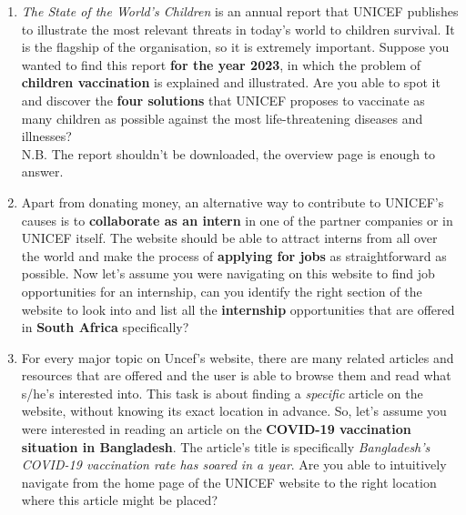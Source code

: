 \documentclass[11pt]{article}
\begin{document}
\begin{Form}
\begin{enumerate}
		\item \textit{The State of the World's Children} is an annual report that UNICEF publishes to illustrate the most relevant threats in today's world to children survival. It is the flagship of the organisation, so it is extremely important. Suppose you wanted to find this report \textbf{for the year 2023}, in which the problem of \textbf{children vaccination} is explained and illustrated. Are you able to spot it and discover the \textbf{four solutions} that UNICEF proposes to vaccinate as many children as possible against the most life-threatening diseases and illnesses?\\
		N.B. The report shouldn't be downloaded, the overview page is enough to answer.
		
		\item Apart from donating money, an alternative way to contribute to UNICEF's causes is to \textbf{collaborate as an intern} in one of the partner companies or in UNICEF itself. The website should be able to attract interns from all over the world and make the process of \textbf{applying for jobs} as straightforward as possible. Now let's assume you were navigating on this website to find job opportunities for an internship, can you identify the right section of the website to look into and list all the \textbf{internship} opportunities that are offered in \textbf{South Africa} specifically?
		
		\item For every major topic on Uncef's website, there are many related articles and resources that are offered and the user is able to browse them and read what s/he's interested into. This task is about finding a \textit{specific} article on the website, without knowing its exact location in advance. So, let's assume you were interested in reading an article on the\textbf{ COVID-19 vaccination situation in Bangladesh}. The article's title is specifically \textit{Bangladesh's COVID-19 vaccination rate has soared in a year}. Are you able to intuitively navigate from the home page of the UNICEF website to the right location where this article might be placed?
		
		
	\end{enumerate}
			

	
	\end{Form}
	
	\clearpage
	
	
\end{document}
